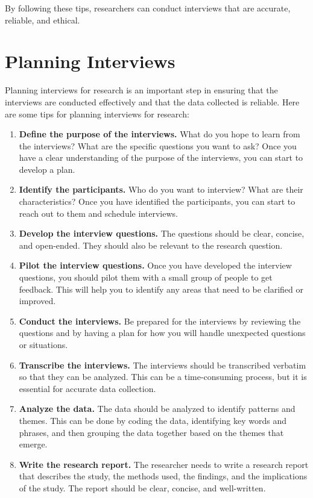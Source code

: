 \documentclass[
  b5paper]{book}
\begin{document}
By following these tips, researchers can conduct interviews that are accurate, reliable, and ethical.

\hypertarget{planning-interviews}{%
\section{Planning Interviews}\label{planning-interviews}}

Planning interviews for research is an important step in ensuring that the interviews are conducted effectively and that the data collected is reliable. Here are some tips for planning interviews for research:

\begin{enumerate}
\def\labelenumi{\arabic{enumi}.}
\item
  \textbf{Define the purpose of the interviews.} What do you hope to learn from the interviews? What are the specific questions you want to ask? Once you have a clear understanding of the purpose of the interviews, you can start to develop a plan.
\item
  \textbf{Identify the participants.} Who do you want to interview? What are their characteristics? Once you have identified the participants, you can start to reach out to them and schedule interviews.
\item
  \textbf{Develop the interview questions.} The questions should be clear, concise, and open-ended. They should also be relevant to the research question.
\item
  \textbf{Pilot the interview questions.} Once you have developed the interview questions, you should pilot them with a small group of people to get feedback. This will help you to identify any areas that need to be clarified or improved.
\item
  \textbf{Conduct the interviews.} Be prepared for the interviews by reviewing the questions and by having a plan for how you will handle unexpected questions or situations.
\item
  \textbf{Transcribe the interviews.} The interviews should be transcribed verbatim so that they can be analyzed. This can be a time-consuming process, but it is essential for accurate data collection.
\item
  \textbf{Analyze the data.} The data should be analyzed to identify patterns and themes. This can be done by coding the data, identifying key words and phrases, and then grouping the data together based on the themes that emerge.
\item
  \textbf{Write the research report.} The researcher needs to write a research report that describes the study, the methods used, the findings, and the implications of the study. The report should be clear, concise, and well-written.
\end{enumerate}
\end{document}
